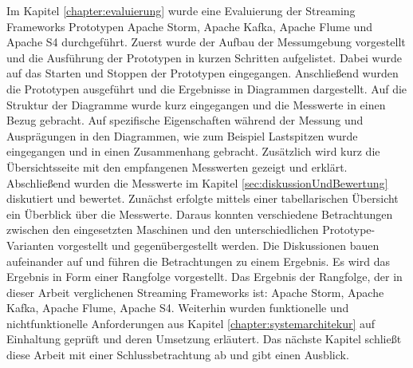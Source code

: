 Im Kapitel \ref{chapter:evaluierung} wurde eine Evaluierung der Streaming Frameworks Prototypen Apache Storm, Apache Kafka, Apache Flume und Apache S4 durchgeführt. Zuerst wurde der Aufbau der Messumgebung vorgestellt und die Ausführung der Prototypen in kurzen Schritten aufgelistet. Dabei wurde auf das Starten und Stoppen der Prototypen eingegangen. Anschließend wurden die Prototypen ausgeführt und die Ergebnisse in Diagrammen dargestellt. Auf die Struktur der Diagramme wurde kurz eingegangen und die Messwerte in einen Bezug gebracht. Auf spezifische Eigenschaften während der Messung und Ausprägungen in den Diagrammen, wie zum Beispiel Lastspitzen wurde eingegangen und in einen Zusammenhang gebracht. Zusätzlich wird kurz die Übersichtsseite mit den empfangenen Messwerten gezeigt und erklärt. Abschließend wurden die Messwerte im Kapitel \ref{sec:diskussionUndBewertung} diskutiert und bewertet. Zunächst erfolgte mittels einer tabellarischen Übersicht ein Überblick über die Messwerte. Daraus konnten verschiedene Betrachtungen zwischen den eingesetzten Maschinen und den unterschiedlichen Prototype-Varianten vorgestellt und gegenübergestellt werden. Die Diskussionen bauen aufeinander auf und führen die Betrachtungen zu einem Ergebnis. Es wird das Ergebnis in Form einer Rangfolge vorgestellt. Das Ergebnis der Rangfolge, der in dieser Arbeit verglichenen Streaming Frameworks ist: Apache Storm, Apache Kafka, Apache Flume, Apache S4. Weiterhin wurden funktionelle und nichtfunktionelle Anforderungen aus Kapitel \ref{chapter:systemarchitekur} auf Einhaltung geprüft und deren Umsetzung erläutert. Das nächste Kapitel schließt diese Arbeit mit einer Schlussbetrachtung ab und gibt einen Ausblick.